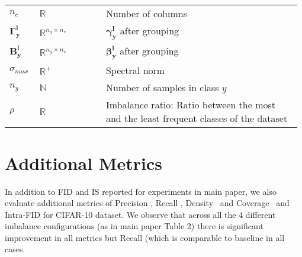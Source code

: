 \documentclass[runningheads,table]{llncs}
\begin{document}
\begin{table}[t]
{\begin{tabular}{p{0.1\linewidth} p{0.225
\linewidth} p{0.65\linewidth}}
$n_c$                   & $\mathbb{R}$                       & Number of columns                                                                     \\
$\mathbf{\Gamma^l_y}$    & $\mathbb{R}^{n_g \times n_c}$      & $\mathbf{\gamma^l_y}$ after grouping                                                  \\
$\mathbf{B^l_y}$       & $\mathbb{R}^{n_g \times n_c}$      & $\mathbf{\beta^l_y}$ after grouping                                                   \\
$\sigma_{max}$          & $\mathbb{R}^+$                     & Spectral norm                                                                         \\
$n_y$                   & $\mathbb{N}$                       & Number of samples in class $y$                                                        \\
$\rho$                  & $\mathbb{R}$                       & Imbalance ratio: Ratio between the most and the least frequent classes of the dataset \\ \bottomrule
\end{tabular}}
\end{table}

\section{Additional Metrics}
\label{sec:supp:metrics}
In addition to FID and IS reported for experiments in main paper, we also evaluate additional metrics of Precision \cite{kynkaanniemi2019improved}, Recall \cite{kynkaanniemi2019improved}, Density~\cite{yu2020inclusive} and Coverage~\cite{yu2020inclusive} and Intra-FID for CIFAR-10 dataset.
We observe that across all the 4 different imbalance configurations (as in main paper Table {\color{red} 2}) there is significant improvement in all metrics but Recall (which is comparable to baseline in all cases.
\end{document}
